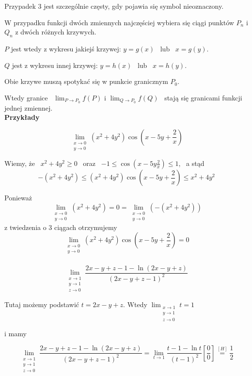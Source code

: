 Przypadek 3 jest szczególnie częsty, gdy pojawia się symbol nieoznaczony.

W przypadku funkcji dwóch zmiennych najczęściej wybiera się ciągi punktów $P_n$ i $Q_n$ z dwóch różnych krzywych.

$P$ jest wtedy z wykresu jakiejś krzywej: $ y=g(x)$ \ lub \ $x=g(y)$.

$Q$ jest z wykresu innej krzywej: $y=h(x)$ \ lub \ $x=h(y)$.

Obie krzywe muszą spotykać się w punkcie granicznym $P_0$.

Wtedy granice \ $ \lim_{P \to P_0} f(P) $ \quad i \quad $ \lim_{Q \to P_0} f(Q) $ \ stają się granicami funkcji jednej zmiennej. \\

\textbf{Przykłady}

$$ \lim_{\substack{x \to 0 \\ y \to 0}} (x^2 + 4y^2) \cos \left( x - 5y + \frac{2}{x} \right) $$

Wiemy, że \ $ x^2 + 4y^2 \geq 0 $ \ oraz \ $ -1 \leq \cos \left( x - 5y \frac{2}{x} \right) \leq 1 $, \ a stąd
$$ -(x^2 + 4y^2) \leq (x^2 + 4y^2) \cos \left( x - 5y + \frac{2}{x} \right) \leq x^2 + 4y^2 $$

Ponieważ 
$$ \lim_{\substack{x \to 0 \\ y \to 0}} (x^2 + 4y^2) = 0 = \lim_{\substack{x \to 0 \\ y \to 0}} (-(x^2 + 4y^2)) $$
z twiedzenia o 3 ciągach otrzymujemy
$$ \lim_{\substack{x \to 0 \\ y \to 0}} (x^2 + 4y^2) \cos \left( x - 5y + \frac{2}{x} \right) = 0 $$ \\

$$ \lim_{\substack{x \to 1 \\ y \to 1 \\ z \to 0}} \frac{2x - y + z - 1 - \ln(2x - y + z)}{(2x - y + z - 1)^2} $$

Tutaj możemy podstawić $ t = 2x - y + z $. Wtedy $ \lim_{\substack{x \to 1 \\ y \to 1 \\ z \to 0}} t = 1 $

i mamy

$$ \lim_{\substack{x \to 1 \\ y \to 1 \\ z \to 0}} \frac{2x - y + z - 1 - \ln(2x - y + z)}{(2x - y + z - 1)^2}
= \lim_{t \to 1} \frac{t - 1 - \ln t}{(t-1)^2} \left[ \frac{0}{0} \right] \stackrel{[H]}{=} \frac{1}{2}$$ \\

